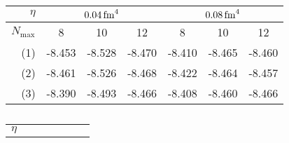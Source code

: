 \begin{table}[H]
\begin{subtable}{\textwidth}
  \end{subtable}
  \par\bigskip
  \begin{subtable}{\textwidth}
    \caption{}
    \centering
    \begin{tabular}{
        r|
        S[table-format=-2.3(3)]
        S[table-format=-2.3(3)]
        S[table-format=-2.3(3)]
        S[table-format=-2.3(3)]
        S[table-format=-2.3(3)]
        S[table-format=-2.3(3)]
      }
      \toprule
      $\eta$                           &
       &
         \\
      \midrule
      $N_\mathrm{max}$                 &
      {8}                              &
      {10}                             &
      {12}                             &
      {8}                              &
      {10}                             &
      {12}                               \\
      \midrule
      (1)                              &
      -8.453                  &
      -8.528                  &
      -8.470                  &
      -8.410                  &
      -8.465                  &
      -8.460                    \\
      (2)                              &
      -8.461                  &
      -8.526                  &
      -8.468                  &
      -8.422                  &
      -8.464                  &
      -8.457                    \\
      (3)                              &
      -8.390                  &
      -8.493                  &
      -8.466                  &
      -8.408                  &
      -8.460                  &
      -8.466                    \\
      \bottomrule
    \end{tabular}
  \end{subtable}
  \par\bigskip
  \begin{subtable}{\textwidth}
    \caption{}
    \centering
    \begin{tabular}{
        r|
        S[table-format=-2.3(3)]
        S[table-format=-2.3(3)]
        S[table-format=-2.3(3)]
        S[table-format=-2.3(3)]
        S[table-format=-2.3(3)]
        S[table-format=-2.3(3)]
      }
      \toprule
      $\eta$                           &

\end{tabular}
\end{subtable}
\end{table}
